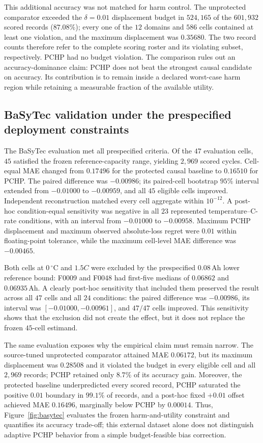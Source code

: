 \documentclass[preprint,12pt]{elsarticle}
\begin{document}
This additional accuracy was not matched for harm control. The unprotected comparator exceeded the $\delta=0.01$ displacement budget in $524{,}165$ of the $601{,}932$ scored records ($87.08\%$); every one of the $12$ domains and $586$ cells contained at least one violation, and the maximum displacement was $0.35680$. The two record counts therefore refer to the complete scoring roster and its violating subset, respectively. PCHP had no budget violation. The comparison rules out an accuracy-dominance claim: PCHP does not beat the strongest causal candidate on accuracy. Its contribution is to remain inside a declared worst-case harm region while retaining a measurable fraction of the available utility.

\subsection{BaSyTec validation under the prespecified deployment constraints}

The BaSyTec evaluation met all prespecified criteria. Of the $47$ evaluation cells, $45$ satisfied the frozen reference-capacity range, yielding $2{,}969$ scored cycles. Cell-equal MAE changed from $0.17496$ for the protected causal baseline to $0.16510$ for PCHP. The paired difference was $-0.00986$; its paired-cell bootstrap $95\%$ interval extended from $-0.01000$ to $-0.00959$, and all $45$ eligible cells improved. Independent reconstruction matched every cell aggregate within $10^{-12}$. A post-hoc condition-equal sensitivity was negative in all $23$ represented temperature--C-rate conditions, with an interval from $-0.01000$ to $-0.00958$. Maximum PCHP displacement and maximum observed absolute-loss regret were $0.01$ within floating-point tolerance, while the maximum cell-level MAE difference was $-0.00465$.

Both cells at $0\,^{\circ}\mathrm{C}$ and $1.5C$ were excluded by the prespecified $0.08\,\mathrm{Ah}$ lower reference bound: F0009 and F0048 had first-five medians of $0.06862$ and $0.06935\,\mathrm{Ah}$. A clearly post-hoc sensitivity that included them preserved the result across all $47$ cells and all $24$ conditions: the paired difference was $-0.00986$, its interval was $[-0.01000,-0.00961]$, and $47/47$ cells improved. This sensitivity shows that the exclusion did not create the effect, but it does not replace the frozen $45$-cell estimand.

The same evaluation exposes why the empirical claim must remain narrow. The source-tuned unprotected comparator attained MAE $0.06172$, but its maximum displacement was $0.28508$ and it violated the budget in every eligible cell and all $2{,}969$ records; PCHP retained only $8.7\%$ of its accuracy gain. Moreover, the protected baseline underpredicted every scored record, PCHP saturated the positive $0.01$ boundary in $99.1\%$ of records, and a post-hoc fixed $+0.01$ offset achieved MAE $0.16496$, marginally below PCHP by $0.00014$. Thus, Figure~\ref{fig:basytec} evaluates the frozen harm-and-utility constraint and quantifies its accuracy trade-off; this external dataset alone does not distinguish adaptive PCHP behavior from a simple budget-feasible bias correction.
\end{document}
